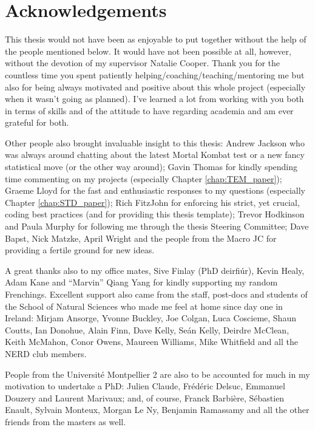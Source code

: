 \chapter*{Acknowledgements}

This thesis would not have been as enjoyable to put together without the help of the people mentioned below.
It would have not been possible at all, however, without the devotion of my supervisor Natalie Cooper.
Thank you for the countless time you spent patiently helping/coaching/teaching/mentoring me but also for being always motivated and positive about this whole project (especially when it wasn't going as planned).
I've learned a lot from working with you both in terms of skills and of the attitude to have regarding academia and am ever grateful for both.

Other people also brought invaluable insight to this thesis:
Andrew Jackson who was always around chatting about the latest Mortal Kombat test or a new fancy statistical move (or the other way around);
Gavin Thomas for kindly spending time commenting on my projects (especially Chapter \ref{chap:TEM_paper});
Graeme Lloyd for the fast and enthusiastic responses to my questions (especially Chapter \ref{chap:STD_paper});
Rich FitzJohn for enforcing his strict, yet crucial, coding best practices (and for providing this thesis template);
Trevor Hodkinson and Paula Murphy for following me through the thesis Steering Committee;
Dave Bapst, Nick Matzke, April Wright and the people from the Macro JC for providing a fertile ground for new ideas.

A great thanks also to my office mates, Sive Finlay (PhD deirfi\'{u}r), Kevin Healy, Adam Kane and ``Marvin'' Qiang Yang for kindly supporting my random Frenchings.
Excellent support also came from the staff, post-docs and students of the School of Natural Sciences who made me feel at home since day one in Ireland:
Mirjam Ansorge, Yvonne Buckley, Joe Colgan, Luca Coscieme, Shaun Coutts, Ian Donohue, Alain Finn, Dave Kelly, Se\'{a}n Kelly, Deirdre McClean, Keith McMahon, Conor Owens, Maureen Williams, Mike Whitfield and all the NERD club members.

People from the Universit\'{e} Montpellier 2 are also to be accounted for much in my motivation to undertake a PhD:%
Julien Claude, Fr\'{e}d\'{e}ric Delsuc, Emmanuel Douzery and Laurent Marivaux;
and, of course, Franck Barbi\`{e}re, S\'{e}bastien Enault, Sylvain Monteux, Morgan Le Ny, Benjamin Ramassamy and all the other friends from the masters as well.

